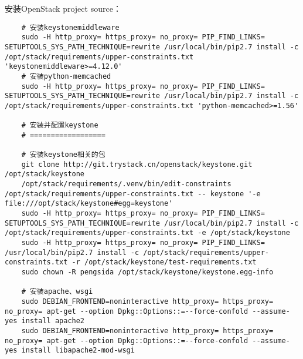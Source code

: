 \documentclass[a4paper,left=1.5cm,right=1.5cm,11pt]{article}
\begin{document}
	安装OpenStack project source：
	\begin{lstlisting}
	# 安装keystonemiddleware
	sudo -H http_proxy= https_proxy= no_proxy= PIP_FIND_LINKS= SETUPTOOLS_SYS_PATH_TECHNIQUE=rewrite /usr/local/bin/pip2.7 install -c /opt/stack/requirements/upper-constraints.txt 'keystonemiddleware>=4.12.0'
	# 安装python-memcached
	sudo -H http_proxy= https_proxy= no_proxy= PIP_FIND_LINKS= SETUPTOOLS_SYS_PATH_TECHNIQUE=rewrite /usr/local/bin/pip2.7 install -c /opt/stack/requirements/upper-constraints.txt 'python-memcached>=1.56'

	# 安装并配置keystone
	# ==================

	# 安装keystone相关的包
	git clone http://git.trystack.cn/openstack/keystone.git /opt/stack/keystone
	/opt/stack/requirements/.venv/bin/edit-constraints /opt/stack/requirements/upper-constraints.txt -- keystone '-e file:///opt/stack/keystone#egg=keystone'
	sudo -H http_proxy= https_proxy= no_proxy= PIP_FIND_LINKS= SETUPTOOLS_SYS_PATH_TECHNIQUE=rewrite /usr/local/bin/pip2.7 install -c /opt/stack/requirements/upper-constraints.txt -e /opt/stack/keystone
	sudo -H http_proxy= https_proxy= no_proxy= PIP_FIND_LINKS= /usr/local/bin/pip2.7 install -c /opt/stack/requirements/upper-constraints.txt -r /opt/stack/keystone/test-requirements.txt
	sudo chown -R pengsida /opt/stack/keystone/keystone.egg-info

	# 安装apache、wsgi
	sudo DEBIAN_FRONTEND=noninteractive http_proxy= https_proxy= no_proxy= apt-get --option Dpkg::Options::=--force-confold --assume-yes install apache2
	sudo DEBIAN_FRONTEND=noninteractive http_proxy= https_proxy= no_proxy= apt-get --option Dpkg::Options::=--force-confold --assume-yes install libapache2-mod-wsgi


\end{lstlisting}
\end{document}
